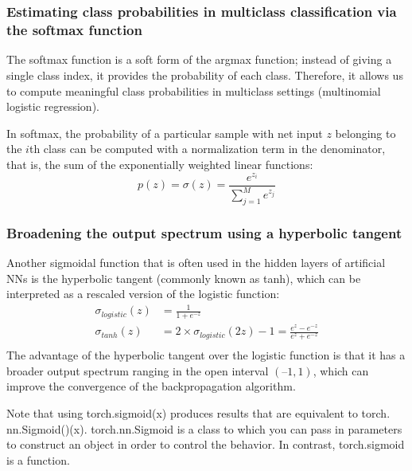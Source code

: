 \chapter{\label{Ch12}}
\section{}
\subsection{Estimating class probabilities in multiclass classification via the softmax function}
The softmax function is a soft form of the argmax function; instead of giving a single class index, it provides the probability of each class. Therefore, it allows us to compute meaningful class probabilities in multiclass settings (multinomial logistic regression).

In softmax, the probability of a particular sample with net input $z$ belonging to the $i$th class can be computed with a normalization term in the denominator, that is, the sum of the exponentially weighted linear functions:
\begin{equation}
    p(z)=\sigma(z)=\frac{e^{z_i}}{\sum_{j=1}^{M}e^{z_j}}
\end{equation}
\subsection{Broadening the output spectrum using a hyperbolic tangent}
Another sigmoidal function that is often used in the hidden layers of artificial NNs is the hyperbolic tangent (commonly known as tanh), which can be interpreted as a rescaled version of the logistic function:
\begin{equation}
    \begin{aligned}
        \sigma_{logistic}(z) & =\frac{1}{1+e^{-z}}                                            \\
        \sigma_{tanh}(z)     & =2\times \sigma_{logistic}(2z)-1=\frac{e^z-e^{-z}}{e^z+e^{-z}} \\
    \end{aligned}
\end{equation}
The advantage of the hyperbolic tangent over the logistic function is that it has a broader output spectrum ranging in the open interval $(–1, 1)$, which can improve the convergence of the backpropagation algorithm.

Note that using torch.sigmoid(x) produces results that are equivalent to torch. nn.Sigmoid()(x). torch.nn.Sigmoid is a class to which you can pass in parameters to construct an object in order to control the behavior. In contrast, torch.sigmoid is a function.